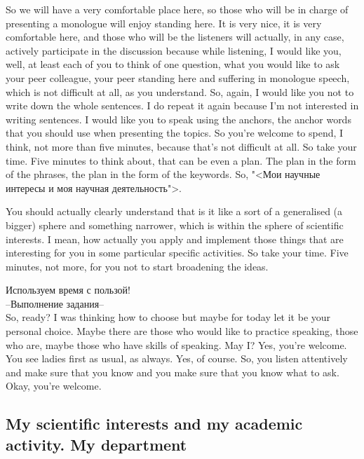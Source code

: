 \documentclass[main.tex]{subfiles}
\begin{document}
So we will have a very comfortable place here, so those who will be in charge of presenting a monologue will enjoy standing here.
It is very nice, it is very comfortable here, and those who will be the listeners will actually, in any case, actively participate in the discussion because while listening, I would like you, well, at least each of you to think of one question, what you would like to ask your peer colleague, your peer standing here and suffering in monologue speech, which is not difficult at all, as you understand.
So, again, I would like you not to write down the whole sentences.
I do repeat it again because I'm not interested in writing sentences.
I would like you to speak using the anchors, the anchor words that you should use when presenting the topics.
So you're welcome to spend, I think, not more than five minutes, because that's not difficult at all.
So take your time.
Five minutes to think about, that can be even a plan.
The plan in the form of the phrases, the plan in the form of the keywords.
So, "<Мои научные интересы и моя научная деятельность">.

You should actually clearly understand that is it like a sort of a generalised (a bigger) sphere and something narrower, which is within the sphere of scientific interests.
I mean, how actually you apply and implement those things that are interesting for you in some particular specific activities.
So take your time.
Five minutes, not more, for you not to start broadening the ideas.

Используем время с пользой!
\\

--Выполнение задания--
\\

So, ready?
I was thinking how to choose but maybe for today let it be your personal choice.
Maybe there are those who would like to practice speaking, those who are, maybe those who have skills of speaking.
May I?
Yes, you're welcome.
You see ladies first as usual, as always.
Yes, of course.
So, you listen attentively and make sure that you know and you make sure that you know what to ask.
Okay, you're welcome.

\subsection{My scientific interests and my academic activity. My department}
\end{document}
